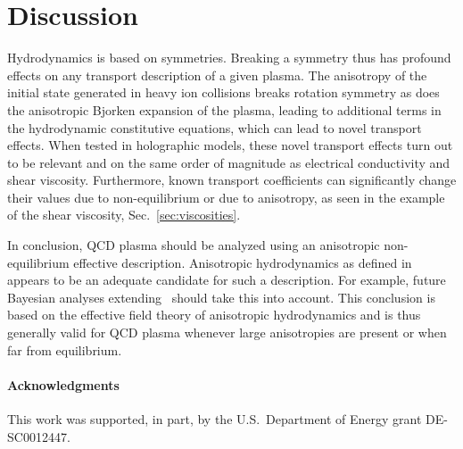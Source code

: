 \documentclass[preprint,12pt]{elsarticle}
\begin{document}
\section{Discussion}
\label{sec:discussion}
%
Hydrodynamics is based on symmetries. Breaking a symmetry thus has profound effects on any transport description of a given plasma. The anisotropy of the initial state generated in heavy ion collisions breaks rotation symmetry as does the anisotropic Bjorken expansion of the plasma, leading to additional terms in the hydrodynamic constitutive equations, which can lead to novel transport effects. When tested in holographic models, these novel transport effects turn out to be relevant and on the same order of magnitude as electrical conductivity and shear viscosity. 
%
Furthermore, known transport coefficients can significantly change their values due to non-equilibrium or due to anisotropy, as seen in the example of the shear viscosity, Sec.~\ref{sec:viscosities}.  
%
\begin{mdframed}
    In conclusion, QCD plasma should be analyzed using an anisotropic non-equilibrium effective description. Anisotropic hydrodynamics as defined in~\cite{Ammon:2020rvg,Garbiso:2020puw,Cartwright:2026} appears to be an adequate candidate for such a description. For example, future Bayesian analyses extending~\cite{Bernhard:2019bmu} should take this into account.  
    This conclusion is based on the effective field theory of anisotropic hydrodynamics and is thus generally valid for QCD plasma whenever large anisotropies are present or when far from equilibrium. 
\end{mdframed}

\paragraph*{Acknowledgments}
This work was supported, in part, by the U.S.~Department of Energy grant DE-SC0012447. 



\end{document}
